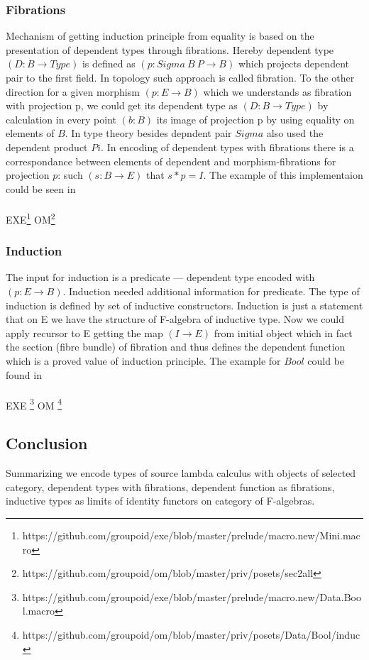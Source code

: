 \documentclass[11pt,oneside]{article}
\begin{document}
\subsubsection{Fibrations}

Mechanism of getting induction principle from equality is based on the presentation
of dependent types through fibrations. Hereby dependent type $(D: B \rightarrow Type)$ is defined as $(p: Sigma\ B\ P \rightarrow B)$
which projects dependent pair to the first field. In topology such approach is called fibration.
To the other direction for a given morphism $(p: E \rightarrow B)$ which we understands as fibration with projection p,
we could get its dependent type as $(D: B \rightarrow Type)$ by calculation in every point $(b: B)$ its image of
projection p by using equality on elements of $B$. In type theory besides depndent pair $Sigma$ also
used the dependent product $Pi$. In encoding of dependent types with fibrations there is a correspondance
between elements of dependent and morphism-fibrations for projection $p$: such $(s: B \rightarrow E)$ that $s * p = I$.
The example of this implementaion could be seen in\\
\\
EXE\footnote{https://github.com/groupoid/exe/blob/master/prelude/macro.new/Mini.macro}
OM\footnote{https://github.com/groupoid/om/blob/master/priv/posets/sec2all}

\subsubsection{Induction}
The input for induction is a predicate — dependent type encoded with $(p: E \rightarrow B)$.
Induction needed additional information for predicate. The type of induction is defined
by set of inductive constructors. Induction is just a statement that on E we have the
structure of F-algebra of inductive type. Now we could apply recursor to E
getting the map $(I \rightarrow E)$ from initial object which in fact the section (fibre bundle) of fibration
and thus defines the dependent function which is a proved value of induction principle.
The example for $Bool$ could be found in\\
\\
EXE \footnote{https://github.com/groupoid/exe/blob/master/prelude/macro.new/Data.Bool.macro}
OM \footnote{https://github.com/groupoid/om/blob/master/priv/posets/Data/Bool/induc}\\

\subsection{Conclusion}
Summarizing we encode types of source lambda calculus with objects of selected category,
dependent types with fibrations, dependent function as fibrations, inductive types as
limits of identity functors on category of F-algebras.
\end{document}

